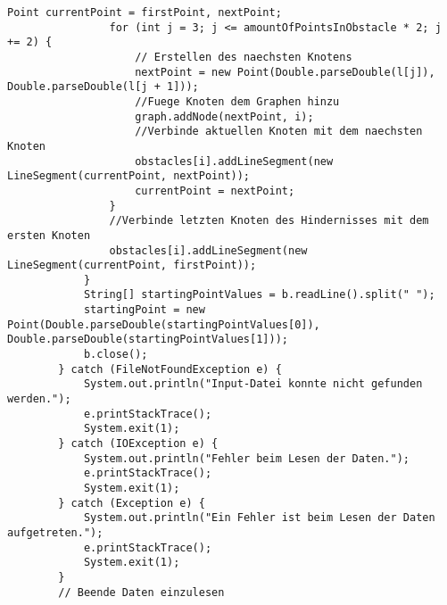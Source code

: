 \documentclass[a4paper,10pt,ngerman]{scrartcl}
\begin{document}
\begin{lstlisting}[frame=single]
                Point currentPoint = firstPoint, nextPoint;
                for (int j = 3; j <= amountOfPointsInObstacle * 2; j += 2) {
                    // Erstellen des naechsten Knotens
                    nextPoint = new Point(Double.parseDouble(l[j]), Double.parseDouble(l[j + 1]));
                    //Fuege Knoten dem Graphen hinzu
                    graph.addNode(nextPoint, i);
                    //Verbinde aktuellen Knoten mit dem naechsten Knoten
                    obstacles[i].addLineSegment(new LineSegment(currentPoint, nextPoint));
                    currentPoint = nextPoint;
                }
                //Verbinde letzten Knoten des Hindernisses mit dem ersten Knoten
                obstacles[i].addLineSegment(new LineSegment(currentPoint, firstPoint));
            }
            String[] startingPointValues = b.readLine().split(" ");
            startingPoint = new Point(Double.parseDouble(startingPointValues[0]), Double.parseDouble(startingPointValues[1]));
            b.close();
        } catch (FileNotFoundException e) {
            System.out.println("Input-Datei konnte nicht gefunden werden.");
            e.printStackTrace();
            System.exit(1);
        } catch (IOException e) {
            System.out.println("Fehler beim Lesen der Daten.");
            e.printStackTrace();
            System.exit(1);
        } catch (Exception e) {
            System.out.println("Ein Fehler ist beim Lesen der Daten aufgetreten.");
            e.printStackTrace();
            System.exit(1);
        }
        // Beende Daten einzulesen


\end{lstlisting}
\end{document}
